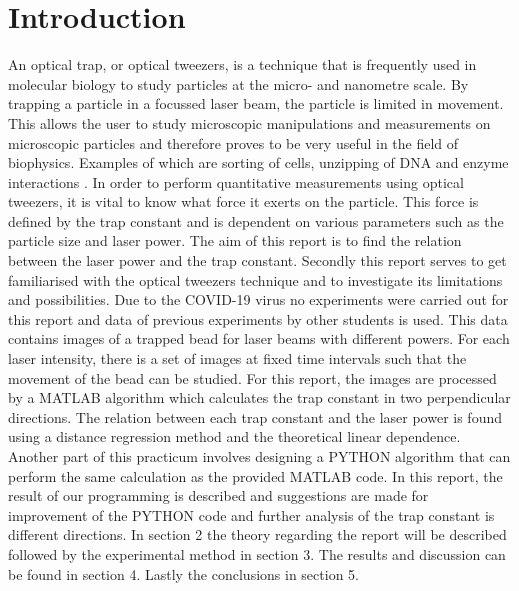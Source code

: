 \section{Introduction}

An optical trap, or optical tweezers, is a technique that is frequently used in molecular biology to study particles at the micro- and nanometre scale. By trapping a particle in a focussed laser beam, the particle is limited in movement. This allows the user to study microscopic manipulations and measurements on microscopic particles and therefore proves to be very useful in the field of biophysics. Examples of which are sorting of cells, unzipping of DNA and enzyme interactions \cite{shaevitz}\cite{velthuis}.
In order to perform quantitative measurements using optical tweezers, it is vital to know what force it exerts on the particle. This force is defined by the trap constant and is dependent on various parameters such as the particle size and laser power.
The aim of this report is to find the relation between the laser power and the trap constant. Secondly this report serves to get familiarised with the optical tweezers technique and to investigate its limitations and possibilities.
Due to the COVID-19 virus no experiments were carried out for this report and data of previous experiments by other students is used. This data contains images of a trapped bead for laser beams with different powers. For each laser intensity, there is a set of images at fixed time intervals such that the movement of the bead can be studied. For this report, the images are processed by a MATLAB algorithm which calculates the trap constant in two perpendicular directions. The relation between each trap constant and the laser power is found using a distance regression method and the theoretical linear dependence. Another part of this practicum involves designing a PYTHON algorithm that can perform the same calculation as the provided MATLAB code. In this report, the result of our programming is described and suggestions are made for improvement of the PYTHON code and further analysis of the trap constant is different directions.
In section 2 the theory regarding the report will be described followed by the experimental method in section 3. The results and discussion can be found in section 4. Lastly the conclusions in section 5.








